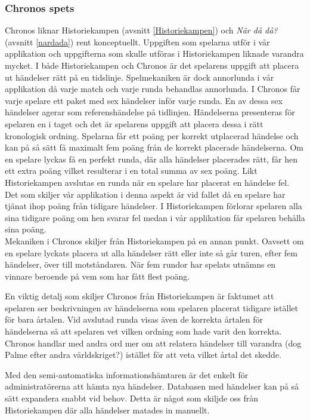 \documentclass[a4paper, 11pt]{article}
\begin{document}
\subsubsection{Chronos spets}
Chronos liknar Historiekampen (avsnitt \ref{Historiekampen}) och \textit{När då då?} (avsnitt \ref{nardada}) rent konceptuellt. Uppgiften som spelarna utför i vår applikation och uppgifterna som skulle utföras i Historiekampen liknade varandra mycket. I både Historiekampen och Chronos är det spelarens uppgift att placera ut händelser rätt på en tidslinje. Spelmekaniken är dock annorlunda i vår applikation då varje match och varje runda behandlas annorlunda. I Chronos får varje spelare ett paket med sex händelser inför varje runda. En av dessa sex händelser agerar som referenshändelse på tidlinjen. Händelserna presenteras för spelaren en i taget och det är spelarens uppgift att placera dessa i rätt kronologisk ordning. Spelarna får ett poäng per korrekt utplacerad händelse och kan på så sätt få maximalt fem poäng från de korrekt placerade händelserna. Om en spelare lyckas få en perfekt runda, där alla händelser placerades rätt, får hen ett extra poäng vilket resulterar i en total summa av sex poäng. Likt Historiekampen avslutas en runda när en spelare har placerat en händelse fel. Det som skiljer vår applikation i denna aspekt är vid fallet då en spelare har tjänat ihop poäng från tidigare händelser. I Historiekampen förlorar spelaren alla sina tidigare poäng om hen svarar fel medan i vår applikation får spelaren behålla sina poäng. \\ Mekaniken i Chronos skiljer från Historiekampen på en annan punkt. Oavsett om en spelare lyckats placera ut alla händelser rätt eller inte så går turen, efter fem händelser, över till motståndaren. När fem rundor har spelats utnämns en vinnare beroende på vem som har fått flest poäng.  

En viktig detalj som skiljer Chronos från Historiekampen är faktumet att spelaren ser beskrivningen av händelserna som spelaren placerat tidigare istället för bara årtalen. Vid avslutad runda visas även de korrekta årtalen för händelserna så att spelaren vet vilken ordning som hade varit den korrekta. Chronos handlar med andra ord mer om att relatera händelser till varandra (dog Palme efter andra världskriget?) istället för att veta vilket årtal det skedde.

Med den semi-automatiska informationshämtaren är det enkelt för administratörerna att hämta nya händelser. Databasen med händelser kan på så sätt expandera snabbt vid behov. Detta är något som skiljde oss från Historiekampen där alla händelser matades in manuellt.
\end{document}
